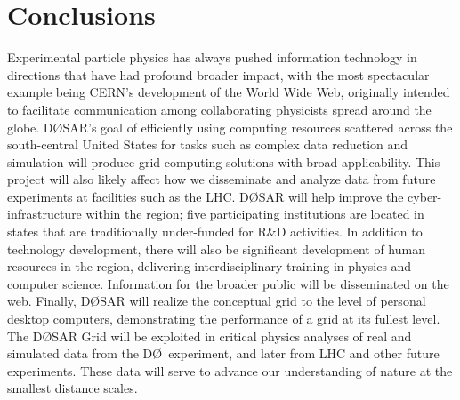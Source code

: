 \documentclass{revtex4}
\newcommand{\DO}{\mbox{D\O}}
\begin{document}
\section{Conclusions}

Experimental particle physics has always pushed information technology in directions that have had profound broader impact, with the most spectacular example being CERN's development of the World Wide Web, originally intended to facilitate communication among collaborating physicists spread around the globe. \DO SAR's goal of efficiently using computing resources scattered across the south-central United States for tasks such as complex data reduction and simulation will produce grid computing solutions with broad applicability.  This project will also likely affect how we disseminate and analyze data from future experiments at facilities such as the LHC. \DO SAR will help improve the cyber-infrastructure within the region; five participating institutions are located in states that are traditionally under-funded for R\&D activities. 
In addition to technology development, there will also be significant development of human resources in the region, delivering interdisciplinary training in physics and computer science. Information for the broader public will be disseminated on the web.
 Finally, \DO SAR will realize the conceptual grid to the level of personal desktop computers, demonstrating the performance of a grid at its fullest level.  The \DO SAR Grid will be exploited in critical physics analyses of real and simulated data from the \DO\ experiment, and later from LHC and other future experiments. These data will serve to advance our understanding of nature at the smallest distance scales. 


\appendix
\end{document}
